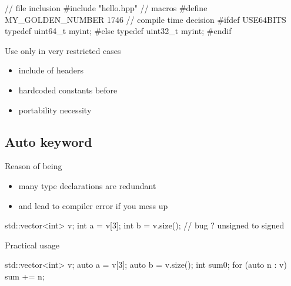 \begin{frame}[fragile]
  \begin{cppcode}
    // file inclusion
    #include "hello.hpp"
    // macros
    #define MY_GOLDEN_NUMBER 1746
    // compile time decision
    #ifdef USE64BITS
      typedef uint64_t myint;
    #else
      typedef uint32_t myint;
    #endif
  \end{cppcode}
  \pause
  \begin{block}{Use only in very restricted cases}
    \begin{itemize}
    \item include of headers
    \item hardcoded constants before 
    \item portability necessity
    \end{itemize}
  \end{block}
\end{frame}
\subsection[auto]{Auto keyword}

\begin{frame}[fragile]
  \begin{block}{Reason of being}
    \begin{itemize}
    \item many type declarations are redundant
    \item and lead to compiler error if you mess up
    \end{itemize}
    \begin{cppcode*}{}
      std::vector<int> v;
      int a = v[3];
      int b = v.size();  // bug ? unsigned to signed
    \end{cppcode*}
  \end{block}
  \pause
  \begin{block}{Practical usage}
    \begin{cppcode*}{}
      std::vector<int> v;
      auto a = v[3];
      auto b = v.size();
      int sum{0};
      for (auto n : v) { sum += n; }
    \end{cppcode*}
  \end{block}
\end{frame}
